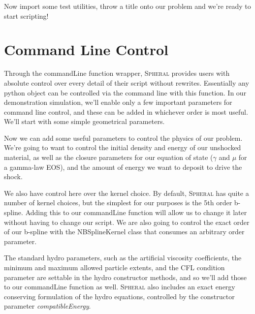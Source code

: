 \documentclass[11pt]{memoir}
\begin{document}


Now import some test utilities, throw a title onto our problem and we're ready to start scripting!



\section{Command Line Control}

Through the commandLine function wrapper, \textsc{Spheral} provides users with absolute control over every detail of their script without rewrites. 
Essentially any python object can be controlled via the command line with this function. 
In our demonstration simulation, we'll enable only a few important parameters for command line control, and these can be added in whichever order is most useful. 
We'll start with some simple geometrical parameters.



Now we can add some useful parameters to control the physics of our problem. 
We're going to want to control the initial density and energy of our unshocked material, as well as the closure parameters for our equation of state ($\gamma$ and $\mu$ for a gamma-law EOS), and the amount of energy we want to deposit to drive the shock.



We also have control here over the kernel choice. 
By default, \textsc{Spheral} has quite a number of kernel choices, but the simplest for our purposes is the 5th order b-spline. 
Adding this to our commandLine function will allow us to change it later without having to change our script. 
We are also going to control the exact order of our b-spline with the NBSplineKernel class that consumes an arbitrary order parameter.



The standard hydro parameters, such as the artificial viscosity coefficients, the minimum and maximum allowed particle extents, and the CFL condition parameter are settable in the hydro constructor methods, and so we'll add those to our commandLine function as well. 
\textsc{Spheral} also includes an exact energy conserving formulation of the hydro equations, controlled by the constructor parameter \textit{compatibleEnergy}.
\end{document}
